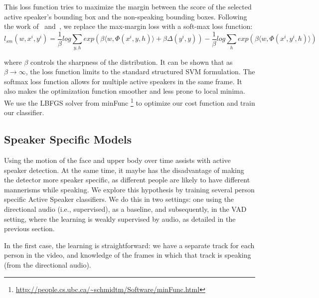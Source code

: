\documentclass[runningheads]{llncs}
\begin{document}
This loss function tries to maximize the margin between the score of the selected active speaker's bounding box and the non-speaking bounding boxes.
%
Following the work of~\cite{Bilen14} and~\cite{Bilen15}, we replace the max-margin loss with a soft-max loss function:
%
\begin{dmath}
l_{sm}(w,x^i,y^i) = \frac{1}{\beta} log \sum_{y,h} exp(\beta \langle w, \Phi(x^i,y,h) \rangle + \beta \Delta(y^i,y)) - \frac{1}{\beta} log \sum_{h} exp(\beta \langle w, \Phi(x^i,y^i,h) \rangle)
\end{dmath}

where $\beta$ controls the sharpness of the distribution. It can be shown that as $\beta \rightarrow \infty$, the loss function limits to the standard structured SVM formulation.
%
The softmax loss function allows for multiple active speakers in the same frame. It also
makes the optimization function smoother and less prone to local minima. We use the LBFGS solver from minFunc \footnote{\url{http://people.cs.ubc.ca/~schmidtm/Software/minFunc.html}
} to optimize our cost function and train our classifier.


\subsection{Speaker Specific Models}
\label{speakerSpecificModels}

Using the motion of the face and upper body over time assists with active speaker detection. At the same time, it maybe has the disadvantage of making the detector more speaker specific, as different people are likely to have different mannerisms while speaking. We explore this hypothesis by training several person specific Active Speaker classifiers.
%
We do this in two settings: one using the directional audio (i.e., supervised), as a baseline, and subsequently, in the VAD setting, where the learning is weakly supervised by audio, as detailed in the previous section.

In the first case, the learning is straightforward: we have a separate track for each person in the video, and knowledge of the frames in which that track is speaking (from the directional audio). %
\end{document}

